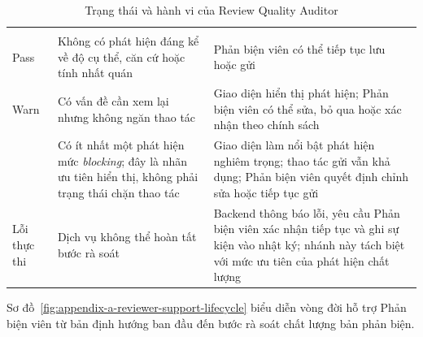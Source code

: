 \begin{longtable}{|T{0.17\textwidth}|T{0.32\textwidth}|T{0.40\textwidth}|}
\caption{Trạng thái và hành vi của Review Quality Auditor}\label{tab:appendix-a-rqa-states}\\
\hline
{} &  &  \\ \hline
\endfirsthead
\hline
{} &  &  \\ \hline
\endhead
Pass & Không có phát hiện đáng kể về độ cụ thể, căn cứ hoặc tính nhất quán & Phản biện viên có thể tiếp tục lưu hoặc gửi \\ \hline
Warn & Có vấn đề cần xem lại nhưng không ngăn thao tác & Giao diện hiển thị phát hiện; Phản biện viên có thể sửa, bỏ qua hoặc xác nhận theo chính sách \\ \hline
{} & Có ít nhất một phát hiện mức \textit{blocking}; đây là nhãn ưu tiên hiển thị, không phải trạng thái chặn thao tác & Giao diện làm nổi bật phát hiện nghiêm trọng; thao tác gửi vẫn khả dụng; Phản biện viên quyết định chỉnh sửa hoặc tiếp tục gửi \\ \hline
Lỗi thực thi & Dịch vụ không thể hoàn tất bước rà soát & Backend thông báo lỗi, yêu cầu Phản biện viên xác nhận tiếp tục và ghi sự kiện vào nhật ký; nhánh này tách biệt với mức ưu tiên của phát hiện chất lượng \\ \hline
\end{longtable}

Sơ đồ~\ref{fig:appendix-a-reviewer-support-lifecycle} biểu diễn vòng đời hỗ trợ Phản biện viên từ bản định hướng ban đầu đến bước rà soát chất lượng bản phản biện.

